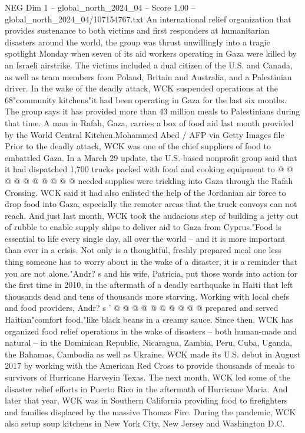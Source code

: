 \begin{textsample}{NEG Dim 1 – global\_north\_2024\_04 – Score 1.00 – global\_north\_2024\_04/107154767.txt}  \label{ex:f1_neg_306}
An international relief organization that provides sustenance to both victims and first responders at humanitarian disasters around the world, the group was thrust unwillingly into a tragic spotlight Monday when seven of its aid workers operating in Gaza were killed by an Israeli airstrike.
The victims included a dual citizen of the U.S. and Canada, as well as team members from Poland, Britain and Australia, and a Palestinian driver.
In the wake of the deadly attack, WCK suspended operations at the 68"community kitchens"it had been operating in Gaza for the last six months.
The group says it has provided more than 43 million meals to Palestinians during that time.
A man in Rafah, Gaza, carries a box of food aid last month provided by the World Central Kitchen.Mohammed Abed / AFP via Getty Images file Prior to the deadly attack, WCK was one of the chief suppliers of food to embattled Gaza.
In a March 29 update, the U.S.-based nonprofit group said that it had dispatched 1,700 trucks packed with food and cooking equipment to @ @ @ @ @ @ @ @ @ @ needed supplies were trickling into Gaza through the Rafah Crossing.
WCK said it had also enlisted the help of the Jordanian air force to drop food into Gaza, especially the remoter areas that the truck convoys can not reach.
And just last month, WCK took the audacious step of building a jetty out of rubble to enable supply ships to deliver aid to Gaza from Cyprus."Food is essential to life every single day, all over the world -- and it is more important than ever in a crisis.
Not only is a thoughtful, freshly prepared meal one less thing someone has to worry about in the wake of a disaster, it is a reminder that you are not alone."Andr? s and his wife, Patricia, put those words into action for the first time in 2010, in the aftermath of a deadly earthquake in Haiti that left thousands dead and tens of thousands more starving.
Working with local chefs and food providers, Andr? s ' @ @ @ @ @ @ @ @ @ @ prepared and served Haitian"comfort food,"like black beans in a creamy sauce.
Since then, WCK has organized food relief operations in the wake of disasters -- both human-made and natural -- in the Dominican Republic, Nicaragua, Zambia, Peru, Cuba, Uganda, the Bahamas, Cambodia as well as Ukraine.
WCK made its U.S. debut in August 2017 by working with the American Red Cross to provide thousands of meals to survivors of Hurricane Harveyin Texas.
The next month, WCK led some of the disaster relief efforts in Puerto Rico in the aftermath of Hurricane Maria.
And later that year, WCK was in Southern California providing food to firefighters and families displaced by the massive Thomas Fire.
During the pandemic, WCK also setup soup kitchens in New York City, New Jersey and Washington D.C.

\end{textsample}
